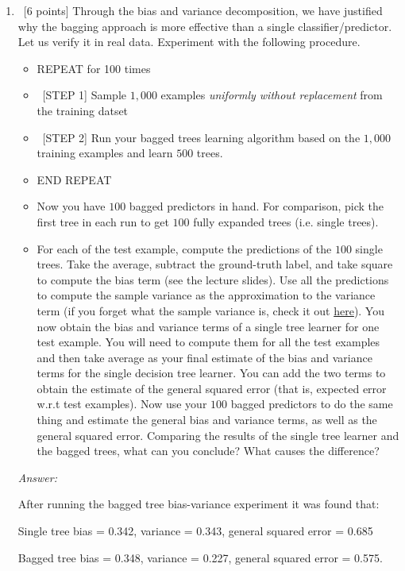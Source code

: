 \documentclass[12pt, fullpage,letterpaper]{article}
\begin{document}
\begin{enumerate}
\begin{enumerate}
	\item~[6 points] Through the bias and variance decomposition, we have justified why the bagging approach is more effective than a single classifier/predictor. Let us verify it in real data. Experiment with the following procedure.
	\begin{itemize}
		\item REPEAT for 100 times
		\item ~[STEP 1] Sample $1,000$ examples \textit{uniformly without replacement} from the training datset
		\item ~[STEP 2] Run your bagged trees learning algorithm based on the $1,000$ training examples and learn $500$ trees.
		\item END REPEAT 
		\item Now you have $100$ bagged predictors in hand. For comparison, pick the first tree in each run to get $100$ fully expanded trees (i.e. single trees). 
		\item 	For each of the test example, compute the predictions of the $100$ single trees. Take the average, subtract the ground-truth label, and take square to compute the bias term (see the lecture slides). Use all the predictions to compute the sample variance  as the approximation to the variance term (if you forget what the sample variance is, check it out 
		\href{http://www.randomservices.org/random/sample/Variance.html}{here}). You now obtain the bias and variance terms of a single tree learner for one test example. You will need to compute them for all the test examples and then take average as your final estimate of the bias and variance terms for the single decision tree learner. You can add the two terms to obtain the estimate of the general squared error (that is, expected error w.r.t test examples). Now use your $100$ bagged predictors to do the same thing and estimate the general bias and variance terms, as well as the general squared error.  Comparing the results of the single tree learner and the bagged trees, what can you conclude?  What causes the difference?  
	\end{itemize}

	\textit{Answer:}

	After running the bagged tree bias-variance experiment it was found that: 

	Single tree bias = 0.342, variance = 0.343, general squared error = 0.685

	Bagged tree bias = 0.348, variance = 0.227, general squared error = 0.575.


\end{enumerate}
\end{enumerate}
\end{document}

